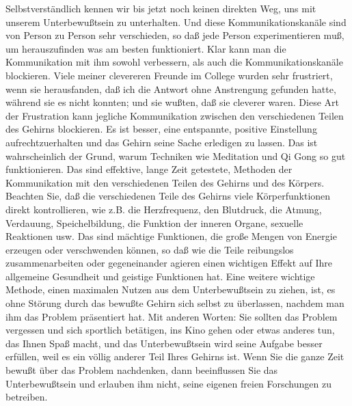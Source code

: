 Selbstverständlich kennen wir bis jetzt noch keinen direkten Weg, uns mit unserem Unterbewußtsein zu unterhalten.
Und diese Kommunikationskanäle sind von Person zu Person sehr verschieden, so daß jede Person experimentieren muß, um herauszufinden was am besten funktioniert.
Klar kann man die Kommunikation mit ihm sowohl verbessern, als auch die Kommunikationskanäle blockieren.
Viele meiner clevereren Freunde im College wurden sehr frustriert, wenn sie herausfanden, daß ich die Antwort ohne Anstrengung gefunden hatte, während sie es nicht konnten; und sie wußten, daß sie cleverer waren.
Diese Art der Frustration kann jegliche Kommunikation zwischen den verschiedenen Teilen des Gehirns blockieren.
Es ist besser, eine entspannte, positive Einstellung aufrechtzuerhalten und das Gehirn seine Sache erledigen zu lassen.
Das ist wahrscheinlich der Grund, warum Techniken wie Meditation und Qi Gong so gut funktionieren.
Das sind effektive, lange Zeit getestete, Methoden der Kommunikation mit den verschiedenen Teilen des Gehirns und des Körpers.
Beachten Sie, daß die verschiedenen Teile des Gehirns viele Körperfunktionen direkt kontrollieren, wie z.B. die Herzfrequenz, den Blutdruck, die Atmung, Verdauung, Speichelbildung, die Funktion der inneren Organe, sexuelle Reaktionen usw.
Das sind mächtige Funktionen, die große Mengen von Energie erzeugen oder verschwenden können, so daß wie die Teile reibungslos zusammenarbeiten oder gegeneinander agieren einen wichtigen Effekt auf Ihre allgemeine Gesundheit und geistige Funktionen hat.
Eine weitere wichtige Methode, einen maximalen Nutzen aus dem Unterbewußtsein zu ziehen, ist, es ohne Störung durch das bewußte Gehirn sich selbst zu überlassen, nachdem man ihm das Problem präsentiert hat.
Mit anderen Worten: Sie sollten das Problem vergessen und sich sportlich betätigen, ins Kino gehen oder etwas anderes tun, das Ihnen Spaß macht, und das Unterbewußtsein wird seine Aufgabe besser erfüllen, weil es ein völlig anderer Teil Ihres Gehirns ist.
Wenn Sie die ganze Zeit bewußt über das Problem nachdenken, dann beeinflussen Sie das Unterbewußtsein und erlauben ihm nicht, seine eigenen freien Forschungen zu betreiben.

